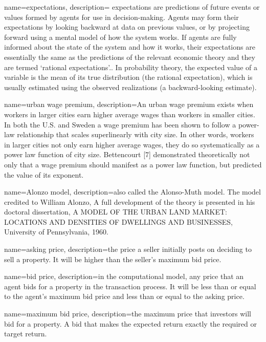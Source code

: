 {
name=expectations,
description={ expectations are predictions of future events or values formed by agents for use in decision-making. Agents may form their expectations by looking backward at data on previous values, or by projecting forward using a mental model of how the system works. If agents are fully informed about the state of the system and how it works, their expectations are essentially the same as the predictions of the relevant economic theory and they are termed `rational expectations'.\cite{muthRationalExpectationsTheory1961}. In probability theory, the expected value of a variable is the mean of its true distribution (the rational expectation), which is usually estimated using the observed realizations (a backward-looking estimate).}
}

{
name=urban wage premium,
description={An urban wage premium exists when workers in larger cities earn higher average wages than workers in smaller cities. In both the U.S.  and Sweden a wage premium has been shown to follow a power-law relationship that scales superlinearly with city size. In other words, workers in larger cities not only earn higher average wages, they do so systematically as a power law function of city size. Bettencourt [7] demonstrated theoretically not only that a wage premium should manifest as a power law function, but predicted the value of its exponent. }
}

{
name=Alonzo model,
description={also called the Alonso-Muth model. The model credited to William Alonzo, A full development of the theory is presented in his doctoral dissertation, A MODEL OF THE URBAN LAND MARKET: LOCATIONS AND DENSITIES OF DWELLINGS AND BUSINESSES, University of Pennsylvania, 1960. }
}

{
name=asking price,
description={the price a seller initially posts on deciding to sell a property. It will be higher than the seller's maximum bid price.}
}

{
name=bid price,
description={in  the computational model, any price that an agent bids for a property in the transaction process. It will be less than or equal to the agent's maximum bid price and less than or equal to the asking price.}
}

{
name=maximum bid price,
description={the maximum price that investors will bid for a property. A bid that makes the expected return exactly the required or  target return.}
}

